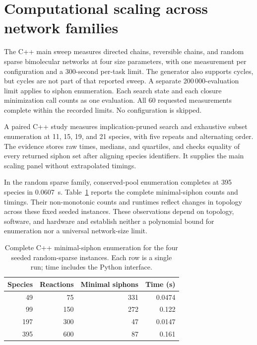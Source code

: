 \documentclass[pdflatex,referee]{../template/sn-jnl}
\theoremstyle{plain}%
\theoremstyle{definition}%
\theoremstyle{remark}%
\newcommand{\ReviewRandomMoietySeconds}{0.0607}
\begin{document}
\section{Computational scaling across network families}
\label{si:scaling}

The C++ main sweep measures directed chains, reversible chains, and random sparse bimolecular networks at four size parameters, with one measurement per configuration and a 300-second per-task limit. The generator also supports cycles, but cycles are not part of that reported sweep. A separate 200\,000-evaluation limit applies to siphon enumeration. Each search state and each closure minimization call counts as one evaluation. All 60 requested measurements complete within the recorded limits. No configuration is skipped.

A paired C++ study measures implication-pruned search and exhaustive subset enumeration at 11, 15, 19, and 21 species, with five repeats and alternating order. The evidence stores raw times, medians, and quartiles, and checks equality of every returned siphon set after aligning species identifiers. It supplies the main scaling panel without extrapolated timings.

In the random sparse family, conserved-pool enumeration completes at 395 species in \ReviewRandomMoietySeconds~s. Table~\ref{tab:random_siphons} reports the complete minimal-siphon counts and timings. Their non-monotonic counts and runtimes reflect changes in topology across these fixed seeded instances. These observations depend on topology, software, and hardware and establish neither a polynomial bound for enumeration nor a universal network-size limit.

\begin{table}[htbp]
\centering
\caption{Complete C++ minimal-siphon enumeration for the four seeded random-sparse instances. Each row is a single run; time includes the Python interface.}
\label{tab:random_siphons}
\begin{tabular}{@{}rrrr@{}}
\toprule
Species & Reactions & Minimal siphons & Time (s) \\
\midrule
49 & 75 & 331 & 0.0474 \\
99 & 150 & 272 & 0.122 \\
197 & 300 & 47 & 0.0147 \\
395 & 600 & 87 & 0.161 \\
\bottomrule
\end{tabular}
\end{table}
\end{document}
